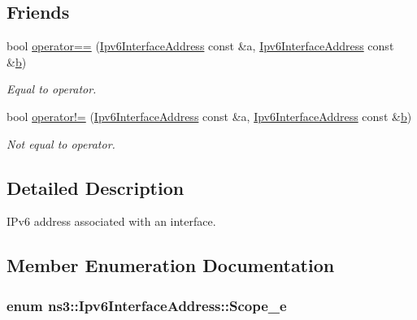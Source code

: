 \subsection*{Friends}
\begin{DoxyCompactItemize}
\item 
bool \hyperlink{classns3_1_1Ipv6InterfaceAddress_a216a1db62cfc5efe35c06a307e74d771}{operator==} (\hyperlink{classns3_1_1Ipv6InterfaceAddress}{Ipv6\+Interface\+Address} const \&a, \hyperlink{classns3_1_1Ipv6InterfaceAddress}{Ipv6\+Interface\+Address} const \&\hyperlink{lte__pathloss_8m_a21ad0bd836b90d08f4cf640b4c298e7c}{b})
\begin{DoxyCompactList}\small\item\em Equal to operator. \end{DoxyCompactList}\item 
bool \hyperlink{classns3_1_1Ipv6InterfaceAddress_a0a306c1a56153c6ec38d03c6b6d2094a}{operator!=} (\hyperlink{classns3_1_1Ipv6InterfaceAddress}{Ipv6\+Interface\+Address} const \&a, \hyperlink{classns3_1_1Ipv6InterfaceAddress}{Ipv6\+Interface\+Address} const \&\hyperlink{lte__pathloss_8m_a21ad0bd836b90d08f4cf640b4c298e7c}{b})
\begin{DoxyCompactList}\small\item\em Not equal to operator. \end{DoxyCompactList}\end{DoxyCompactItemize}


\subsection{Detailed Description}
I\+Pv6 address associated with an interface. 

\subsection{Member Enumeration Documentation}
\subsubsection[{\texorpdfstring{Scope\+\_\+e}{Scope_e}}]{\setlength{\rightskip}{0pt plus 5cm}enum {\bf ns3\+::\+Ipv6\+Interface\+Address\+::\+Scope\+\_\+e}}\hypertarget{classns3_1_1Ipv6InterfaceAddress_ad3f03debf9dae475b81ea9cdf81f4f27}{}\label{classns3_1_1Ipv6InterfaceAddress_ad3f03debf9dae475b81ea9cdf81f4f27}


